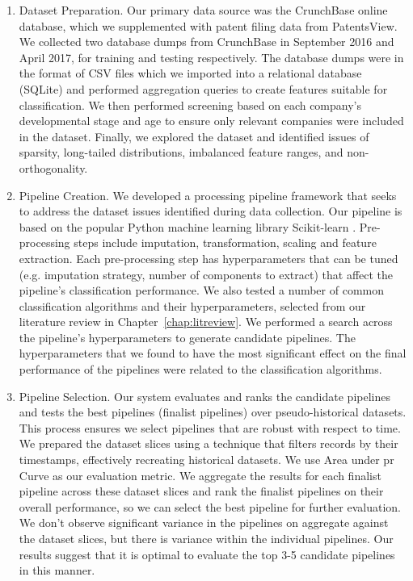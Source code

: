 \documentclass[../thesis/thesis.tex]{subfiles}
\begin{document}
\begin{enumerate}

\item Dataset Preparation. Our primary data source was the CrunchBase online database, which we supplemented with patent filing data from PatentsView. We collected two database dumps from CrunchBase in September 2016 and April 2017, for training and testing respectively. The database dumps were in the format of CSV files which we imported into a relational database (SQLite) and performed aggregation queries to create features suitable for classification. We then performed screening based on each company's developmental stage and age to ensure only relevant companies were included in the dataset. Finally, we explored the dataset and identified issues of sparsity, long-tailed distributions, imbalanced feature ranges, and non-orthogonality.

\item Pipeline Creation. We developed a processing pipeline framework that seeks to address the dataset issues identified during data collection. Our pipeline is based on the popular Python machine learning library Scikit-learn \cite{pedregosa2011}. Pre-processing steps include imputation, transformation, scaling and feature extraction. Each pre-processing step has hyperparameters that can be tuned (e.g. imputation strategy, number of components to extract) that affect the pipeline's classification performance. We also tested a number of common classification algorithms and their hyperparameters, selected from our literature review in Chapter~\ref{chap:litreview}. We performed a search across the pipeline's hyperparameters to generate candidate pipelines. The hyperparameters that we found to have the most significant effect on the final performance of the pipelines were related to the classification algorithms.

\item Pipeline Selection. Our system evaluates and ranks the candidate pipelines and tests the best pipelines (finalist pipelines) over pseudo-historical datasets. This process ensures we select pipelines that are robust with respect to time. We prepared the dataset slices using a technique that filters records by their timestamps, effectively recreating historical datasets. We use Area under \gls{pr} Curve as our evaluation metric. We aggregate the results for each finalist pipeline across these dataset slices and rank the finalist pipelines on their overall performance, so we can select the best pipeline for further evaluation. We don't observe significant variance in the pipelines on aggregate against the dataset slices, but there is variance within the individual pipelines. Our results suggest that it is optimal to evaluate the top 3-5 candidate pipelines in this manner.


\end{enumerate}
\end{document}
